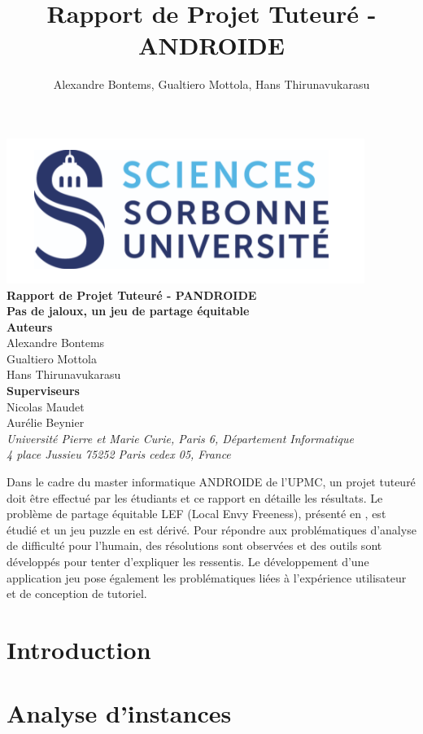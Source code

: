 \documentclass[a4paper, 11pt, titlepage]{article}
\title{Rapport de Projet Tuteuré - ANDROIDE}
\author{Alexandre Bontems, Gualtiero Mottola, Hans Thirunavukarasu}
\begin{document}
	
	\begin{center}
	    \includegraphics[width=0.3\linewidth]{sorbonne}\\[0.8cm]
	    \textsf{\large\bfseries Rapport de Projet Tuteuré - PANDROIDE}\\[0.25cm]
	    \textsf{\Large\bfseries Pas de jaloux, un jeu de partage équitable}\\[0.5cm]
	    \textbf{Auteurs}\\
	    Alexandre Bontems\\Gualtiero Mottola\\Hans Thirunavukarasu\\[0.25cm]
	    \textbf{Superviseurs}\\
	    Nicolas Maudet\\Aurélie Beynier\\[0.5cm]
	    \textit{Université Pierre et Marie Curie, Paris 6, Département Informatique\\4 place Jussieu 75252 Paris cedex 05, France}\\[0.5cm]
	\end{center}
	\begin{adjustwidth}{.5in}{.5in}\small
	    Dans le cadre du master informatique \textsf{ANDROIDE} de l'UPMC, un projet tuteuré doit être effectué par les étudiants et ce rapport en détaille les résultats. Le problème de partage équitable LEF (Local Envy Freeness), présenté en \cite{lef}, est étudié et un jeu puzzle en est dérivé. Pour répondre aux problématiques d'analyse de difficulté pour l'humain, des résolutions  sont observées et des outils sont développés pour tenter d'expliquer les ressentis. Le développement d'une application jeu pose également les problématiques liées à l'expérience utilisateur et de conception de tutoriel. 
	\end{adjustwidth}
	\tableofcontents

	\section{Introduction}
		
	\section{Analyse d'instances}
	    \label{sec-analyse}
        
\end{document}
